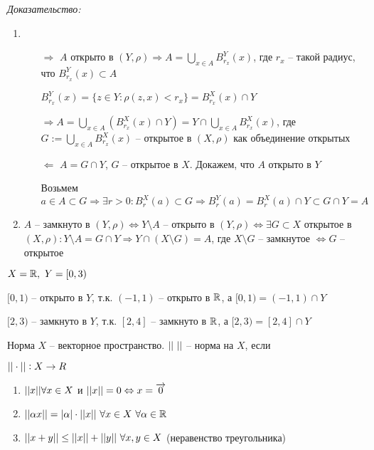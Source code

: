 \documentclass[12pt]{article}
\begin{document}
\textit{Доказательство:}

\begin{enumerate}
    \item 
    
    \begin{itemize}
        \item[$\Rightarrow$] $A$ открыто в $(Y, \rho) \Rightarrow A = \bigcup\limits_{x \in A} B^Y_{r_x}(x)$, где $r_x$ -- такой радиус, что $B^Y_{r_x}(x) \subset A$
        
        $B^Y_{r_x}(x) = \{z \in Y : \rho(z, x) < r_x\} = B^X_{r_x}(x) \cap Y$

        $\Rightarrow A = \bigcup\limits_{x \in A} (B^X_{r_x}(x) \cap Y) = Y \cap \bigcup\limits_{x \in A} B^X_{r_x}(x)$, где $G := \bigcup\limits_{x \in A} B^X_{r_x}(x)$ -- открытое в $(X, \rho)$ как объединение открытых

        \item[$\Leftarrow$] $A = G \cap Y$, $G$ -- открытое в $X$. Докажем, что $A$ открыто в $Y$
        
        Возьмем $a \in A \subset G \Rightarrow \exists r > 0 : B^X_r(a) \subset G \Rightarrow B^Y_r(a) = B^X_r(a) \cap Y \subset G \cap Y = A$
    \end{itemize}

    \item $A$ -- замкнуто в $(Y, \rho) \Leftrightarrow Y \setminus A$ -- открыто в $(Y, \rho) \Leftrightarrow \exists G \subset X$ открытое в \\ 
    $(X, \rho) : Y \setminus A = G \cap Y \Rightarrow Y \cap (X \setminus G) = A$, где $X \setminus G$ -- замкнутое $\Leftrightarrow G$ -- открытое 
\end{enumerate}

\begin{Example}{}
    $X = \mathbb R,\ Y = [0, 3)$

    $[0, 1)$ -- открыто в $Y$, т.к. $(-1, 1)$ -- открыто в $\mathbb R$, а $[0, 1) = (-1, 1) \cap Y$

    $[2, 3)$ -- замкнуто в $Y$, т.к. $[2, 4]$ -- замкнуто в $\mathbb R$, а $[2, 3) = [2, 4] \cap Y$
\end{Example}

\begin{defin}{Норма}
    $X$ -- векторное пространство. $|| \  ||$ -- норма на $X$, если 

    $|| \cdot || : X \to R$

    \begin{enumerate}
        \item $|| x || \forall x \in X$ и $|| x || = 0 \Leftrightarrow x = \overrightarrow{0}$
        \item $|| \alpha x || = |\alpha| \cdot || x ||\ \forall x \in X\ \forall \alpha \in \mathbb R$
        \item $\parl{x + y} \leq \parl{x} + \parl{y}\ \forall x, y \in X$ (неравенство треугольника)
    \end{enumerate}
\end{defin}
\end{document}
